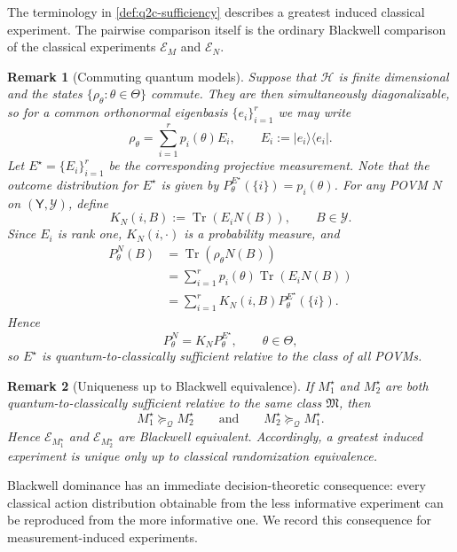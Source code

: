 \documentclass{article}
\newtheorem{remark}{Remark}
\theoremstyle{named}
\theoremstyle{named1}
\newcommand{\Tr}{\operatorname{Tr}}
\newcommand{\cE}{\mathcal{E}}
\newcommand{\cQ}{\mathcal Q}
\newcommand{\cH}{\mathcal H}
\theoremstyle{plain}
\theoremstyle{remark}
\begin{document}
The terminology in \cref{def:q2c-sufficiency} describes a greatest induced
classical experiment. The pairwise comparison itself is the ordinary
Blackwell comparison of the classical experiments $\cE_M$ and $\cE_N$.

\begin{remark}[Commuting quantum models]
\label{rem:commuting-model}
Suppose that $\cH$ is finite dimensional and the states
$\{\rho_\theta:\theta\in\Theta\}$ commute. They are then simultaneously
diagonalizable, so for a common orthonormal eigenbasis
$\{e_i\}_{i=1}^r$ we may write
\[
    \rho_\theta
    =
    \sum_{i=1}^r p_i(\theta)E_i,
    \qquad
    E_i:=|e_i\rangle\langle e_i|.
\]
Let $E^\star=\{E_i\}_{i=1}^r$ be the corresponding projective
measurement. Note that the outcome distribution for $E^\star$ is given by
$
    P_\theta^{E^\star}(\{i\})=p_i(\theta)
$. For any POVM $N$ on $(\mathsf Y,\mathcal Y)$, define
\[
    K_N(i,B)
    :=
    \Tr\!\left(E_iN(B)\right),
    \qquad
    B\in\mathcal Y.
\]
Since $E_i$ is rank one, $K_N(i,\cdot)$ is a probability measure, and
\[
\begin{aligned}
    P_\theta^N(B)
    &=
    \Tr\!\left(\rho_\theta N(B)\right)\\
    &=
    \sum_{i=1}^r
    p_i(\theta)\Tr\!\left(E_iN(B)\right)\\
    &=
    \sum_{i=1}^r
    K_N(i,B)P_\theta^{E^\star}(\{i\}).
\end{aligned}
\]
Hence
\[
    P_\theta^N=K_NP_\theta^{E^\star},
    \qquad \theta\in\Theta,
\]
so $E^\star$ is quantum-to-classically sufficient relative to the
class of all POVMs.
\end{remark}



\begin{remark}[Uniqueness up to Blackwell equivalence]
\label{rem:q2c-uniqueness}
If $M_1^\star$ and $M_2^\star$ are both quantum-to-classically sufficient
relative to the same class $\mathfrak M$, then
\[
    M_1^\star\succeq_{\cQ}M_2^\star
    \qquad\text{and}\qquad
    M_2^\star\succeq_{\cQ}M_1^\star.
\]
Hence $\cE_{M_1^\star}$ and $\cE_{M_2^\star}$ are Blackwell equivalent.
Accordingly, a greatest induced experiment is unique only up to classical
randomization equivalence.
\end{remark}

Blackwell dominance has an immediate decision-theoretic consequence: every
classical action distribution obtainable from the less informative experiment
can be reproduced from the more informative one. We record this consequence
for measurement-induced experiments.
\end{document}
